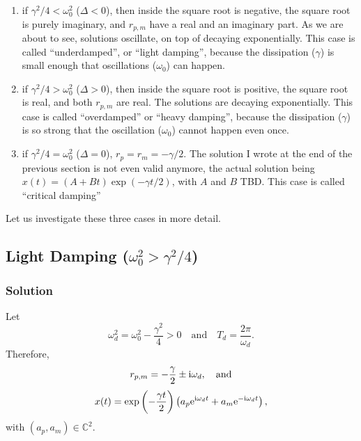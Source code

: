 \documentclass[11pt]{article}
\begin{document}
\begin{enumerate}
\def\labelenumi{\arabic{enumi}.}
\item
  if \(\gamma^2/4 < \omega_0^2\) (\(\Delta < 0\)), then inside the
  square root is negative, the square root is purely imaginary, and
  \(r_{p,m}\) have a real and an imaginary part. As we are about to see,
  solutions oscillate, on top of decaying exponentially. This case is
  called ``underdamped'', or ``light damping'', because the dissipation
  (\(\gamma\)) is small enough that oscillations (\(\omega_0\)) can
  happen.
\item
  if \(\gamma^2/4 > \omega_0^2\) (\(\Delta >0\)), then inside the square
  root is positive, the square root is real, and both \(r_{p,m}\) are
  real. The solutions are decaying exponentially. This case is called
  ``overdamped'' or ``heavy damping'', because the dissipation
  (\(\gamma\)) is so strong that the oscillation (\(\omega_0\)) cannot
  happen even once.
\item
  if \(\gamma^2/4 = \omega_0^2\) (\(\Delta = 0\)),
  \(r_p = r_m = -\gamma/2\). The solution I wrote at the end of the
  previous section is not even valid anymore, the actual solution being
  \(x(t) = (A + B t)\exp(-\gamma t/2)\), with \(A\) and \(B\) TBD. This
  case is called ``critical damping''
\end{enumerate}

Let us investigate these three cases in more detail.

    \hypertarget{light-damping-omega_02-gamma24}{%
\subsection{\texorpdfstring{Light Damping
(\(\omega_0^2 > \gamma^2/4\))}{Light Damping (\textbackslash{}omega\_0\^{}2 \textgreater{} \textbackslash{}gamma\^{}2/4)}}\label{light-damping-omega_02-gamma24}}

\hypertarget{solution}{%
\subsubsection{Solution}\label{solution}}

Let
\[ \omega_d^2 = \omega_0^2 - \frac{\gamma^2}4 >0 \quad\textrm{and}\quad T_d = \frac{2\pi}{\omega_d}. \]
Therefore,
\[r_{p, m} = -\frac\gamma2 \pm \mathrm i\omega_d,\quad \textrm{and} \]
\[ x(t) = \exp\left(- \frac{\gamma t}2\right)\left(a_p\textrm{e}^{\mathrm i\omega_d t} + a_m\textrm{e}^{-\mathrm i\omega_d t}\right),\]
with \((a_p, a_m) \in \mathbb C^2\).
\end{document}
